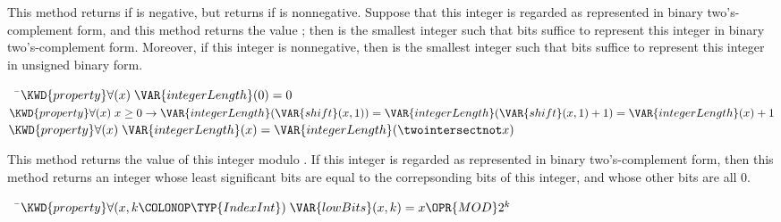 
This method returns  if 
is negative, but returns  if 
is nonnegative.
Suppose that this integer is regarded as represented in binary two's-complement form,
and this method returns the value ;
then  is the smallest integer such that
 bits suffice to represent this integer in  binary two's-complement form.
Moreover, if this integer is nonnegative, then  is the smallest integer such that
 bits suffice to represent this integer in unsigned binary form.

\begin{Fortress}
{\tt~~}\pushtabs\=\+\(  \KWD{property} \forall(x)\; \VAR{integerLength}(0) = 0\)\\
\(  \KWD{property} \forall(x)\; x \geq 0 \rightarrow \VAR{integerLength}(\VAR{shift}(x,1)) = \VAR{integerLength}(\VAR{shift}(x,1)+1) = \VAR{integerLength}(x)+1\)\\
\(  \KWD{property} \forall(x)\; \VAR{integerLength}(x) = \VAR{integerLength}(\twointersectnot x)\)\-\\\poptabs
\end{Fortress}



This method returns the value of this integer modulo .
If this integer is regarded as represented in binary two's-complement form,
then this method returns  an integer whose  least significant bits are equal
to the correpsonding bits of this integer, and whose other bits are all 0.

\begin{Fortress}
{\tt~~}\pushtabs\=\+\(  \KWD{property} \forall (x, k\COLONOP\TYP{IndexInt})\; \VAR{lowBits}(x,k) = x \OPR{MOD} 2^{k}\)\-\\\poptabs
\end{Fortress}


